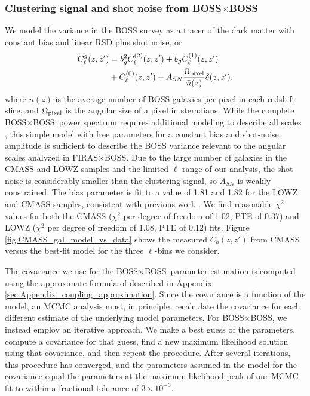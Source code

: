 \documentclass[fleqn,usenatbib]{mnras}
\newcommand{\BB}{BOSS${\times}$BOSS}
\newcommand{\FB}{FIRAS${\times}$BOSS}
\begin{document}
\subsubsection{Clustering signal and shot noise from \texorpdfstring{\BB}{BOSSxBOSS}}\label{subsec:BOSS_auto_model}
We model the variance in the BOSS survey as a tracer of the dark matter with constant bias and linear RSD plus shot noise, or
\begin{equation}
\begin{split}\label{eq:boss_full_model}
C_{\ell}^g(z,z') &= b_g^2C_{\ell}^{(2)}(z,z') + b_gC_{\ell}^{(1)}(z,z')\\
&+ C_{\ell}^{(0)}(z,z') + A_{SN}\frac{\Omega_{\rm pixel}}{\bar n(z)}\delta(z,z'),
\end{split}
\end{equation}
where $\bar n(z)$ is the average number of BOSS galaxies per pixel in each redshift slice, and $\Omega_{\rm pixel}$ is the angular size of a pixel in steradians. While the complete \BB\ power spectrum requires additional modeling to describe all scales \citep{loureiro2019cosmological}, this simple model with free parameters for a constant bias and shot-noise amplitude is sufficient to describe the BOSS variance relevant to the angular scales analyzed in \FB. 
Due to the large number of galaxies in the CMASS and LOWZ samples and the limited $\ell$-range of our analysis, the shot noise is considerably smaller than the clustering signal, so $A_{SN}$ is weakly constrained.
The bias parameter is fit to a value of 1.81 and 1.82 for the LOWZ and CMASS samples, consistent with previous work \citep{salazar2017clustering}. We find reasonable $\chi^2$ values for both the CMASS ($\chi^2$ per degree of freedom of 1.02, PTE of 0.37) and LOWZ ($\chi^2$ per degree of freedom of 1.08, PTE of 0.12) fits. Figure\,\ref{fig:CMASS_gal_model_vs_data} shows the measured $C_b (z,z')$ from CMASS versus the best-fit model for the three $\ell$-bins we consider.

The covariance we use for the \BB\ parameter estimation is computed using the approximate formula of \cite{tristram2005xspect} described in Appendix\,\ref{sec:Appendix_coupling_approximation}.
Since the covariance is a function of the model, an MCMC analysis must, in principle, recalculate the covariance for each different estimate of the underlying model parameters. 
For \BB, we instead employ an iterative approach. We make a best guess of the parameters, compute a covariance for that guess, find a new maximum likelihood solution using that covariance, and then repeat the procedure. After several iterations, this procedure has converged, and the parameters assumed in the model for the covariance equal the parameters at the maximum likelihood peak of our MCMC fit to within a fractional tolerance of $3 \times 10^{-3}$. 
\end{document}
